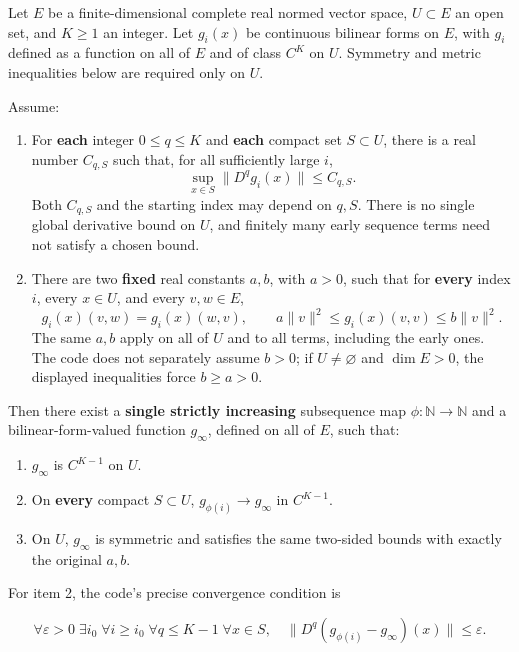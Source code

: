 \documentclass[
  letterpaper,
  11pt]{article}
\providecommand{\tightlist}{%
  \setlength{\itemsep}{0pt}\setlength{\parskip}{0pt}}
\begin{document}
Let \(E\) be a finite-dimensional complete real normed vector space,
\(U\subset E\) an open set, and \(K\geq1\) an integer. Let \(g_i(x)\) be
continuous bilinear forms on \(E\), with \(g_i\) defined as a function
on all of \(E\) and of class \(C^K\) on \(U\). Symmetry and metric
inequalities below are required only on \(U\).

Assume:

\begin{enumerate}
\def\labelenumi{\arabic{enumi}.}
\tightlist
\item
  For \textbf{each} integer \(0\leq q\leq K\) and \textbf{each} compact
  set \(S\subset U\), there is a real number \(C_{q,S}\) such that, for
  all sufficiently large \(i\), \[
       \sup_{x\in S}\|D^q g_i(x)\|\leq C_{q,S}.
  \] Both \(C_{q,S}\) and the starting index may depend on \(q,S\).
  There is no single global derivative bound on \(U\), and finitely many
  early sequence terms need not satisfy a chosen bound.
\item
  There are two \textbf{fixed} real constants \(a,b\), with \(a>0\),
  such that for \textbf{every} index \(i\), every \(x\in U\), and every
  \(v,w\in E\), \[
    g_i(x)(v,w)=g_i(x)(w,v),\qquad
    a\|v\|^2\leq g_i(x)(v,v)\leq b\|v\|^2.
  \] The same \(a,b\) apply on all of \(U\) and to all terms, including
  the early ones. The code does not separately assume \(b>0\); if
  \(U\ne\varnothing\) and \(\dim E>0\), the displayed inequalities force
  \(b\geq a>0\).
\end{enumerate}

Then there exist a \textbf{single strictly increasing} subsequence map
\(\phi:\mathbb N\to\mathbb N\) and a bilinear-form-valued function
\(g_\infty\), defined on all of \(E\), such that:

\begin{enumerate}
\def\labelenumi{\arabic{enumi}.}
\tightlist
\item
  \(g_\infty\) is \(C^{K-1}\) on \(U\).
\item
  On \textbf{every} compact \(S\subset U\), \(g_{\phi(i)}\to g_\infty\)
  in \(C^{K-1}\).
\item
  On \(U\), \(g_\infty\) is symmetric and satisfies the same two-sided
  bounds with exactly the original \(a,b\).
\end{enumerate}

For item 2, the code's precise convergence condition is

\[
 \forall\varepsilon>0\;\exists i_0\;\forall i\geq i_0\;
 \forall q\leq K-1\;\forall x\in S,
 \quad \|D^q(g_{\phi(i)}-g_\infty)(x)\|\leq\varepsilon.
\]
\end{document}

